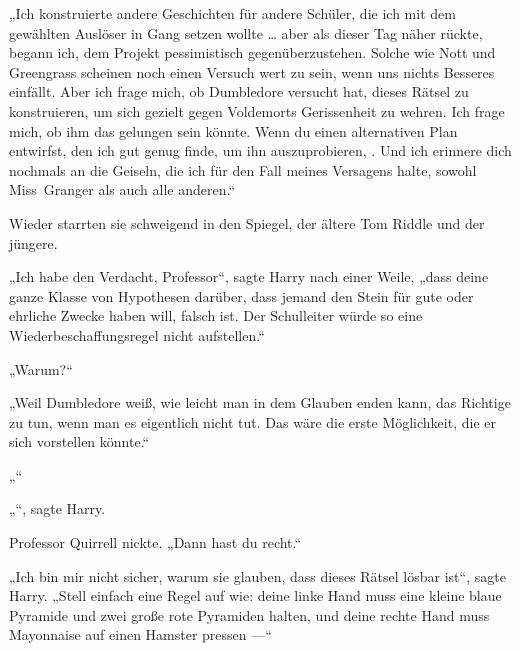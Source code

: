 „Ich konstruierte andere Geschichten für andere Schüler, die ich mit dem gewählten Auslöser in Gang setzen wollte … aber als dieser Tag näher rückte, begann ich, dem Projekt pessimistisch gegenüberzustehen. Solche wie Nott und Greengrass scheinen noch einen Versuch wert zu sein, wenn uns nichts Besseres einfällt. Aber ich frage mich, ob Dumbledore versucht hat, dieses Rätsel zu konstruieren, um sich gezielt gegen Voldemorts Gerissenheit zu wehren. Ich frage mich, ob ihm das gelungen sein könnte. Wenn du einen alternativen Plan entwirfst, den ich gut genug finde, um ihn auszuprobieren, . Und ich erinnere dich nochmals an die Geiseln, die ich für den Fall meines Versagens halte, sowohl Miss~Granger als auch alle anderen.“

Wieder starrten sie schweigend in den Spiegel, der ältere Tom Riddle und der jüngere.

„Ich habe den Verdacht, Professor“, sagte Harry nach einer Weile, „dass deine ganze Klasse von Hypothesen darüber, dass jemand den Stein für gute oder ehrliche Zwecke haben will, falsch ist. Der Schulleiter würde so eine Wiederbeschaffungsregel nicht aufstellen.“

„Warum?“

„Weil Dumbledore weiß, wie leicht man in dem Glauben enden kann, das Richtige zu tun, wenn man es eigentlich nicht tut. Das wäre die erste Möglichkeit, die er sich vorstellen könnte.“

„“

„“, sagte Harry.

Professor Quirrell nickte.
„Dann hast du recht.“

„Ich bin mir nicht sicher, warum sie glauben, dass dieses Rätsel lösbar ist“, sagte Harry.
„Stell einfach eine Regel auf wie: deine linke Hand muss eine kleine blaue Pyramide und zwei große rote Pyramiden halten, und deine rechte Hand muss Mayonnaise auf einen Hamster pressen —“

